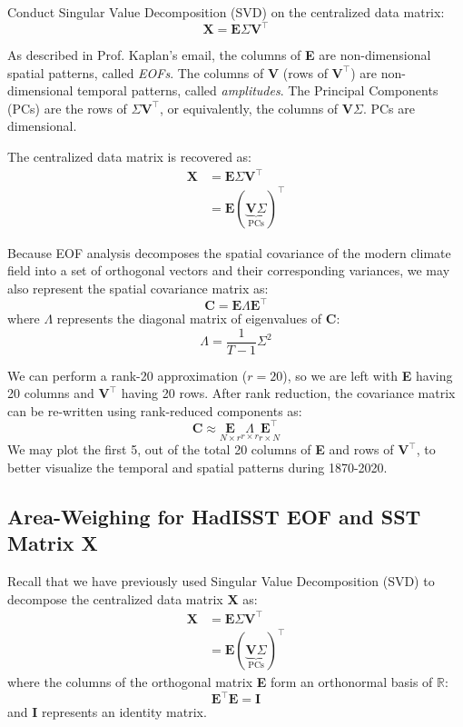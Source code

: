 \documentclass{article}
\begin{document}
Conduct Singular Value Decomposition (SVD) on the centralized data matrix:
$$\textbf{X} = \textbf{E} \Sigma \textbf{V}^\intercal$$

As described in Prof. Kaplan's email, the columns of \textbf{E} are non-dimensional spatial patterns, called \textit{EOFs}. The columns of \textbf{V} (rows of $\textbf{V}^\intercal$) are non-dimensional temporal patterns, called \textit{amplitudes}. The Principal Components (PCs) are the rows of $\Sigma \textbf{V}^\intercal$, or equivalently, the columns of $\textbf{V}\Sigma$. PCs are dimensional.

The centralized data matrix is recovered as:
\begin{align*}
    \textbf{X} &= \textbf{E} \Sigma \textbf{V}^\intercal \\
    &= \textbf{E}{(\underbrace{\textbf{V}\Sigma}_{\text{PCs}})}^\intercal
\end{align*}

Because EOF analysis decomposes the spatial covariance of the modern climate field into a set of orthogonal vectors and their corresponding variances, we may also represent the spatial covariance matrix as:
$$\textbf{C} = \textbf{E} \Lambda \textbf{E}^\intercal$$
where $\Lambda$ represents the diagonal matrix of eigenvalues of \textbf{C}:
$$\Lambda = \frac{1}{T-1}\Sigma^2$$

We can perform a rank-20 approximation ($r=20$), so we are left with \textbf{E} having 20 columns and $\textbf{V}^\intercal$ having 20 rows. After rank reduction, the covariance matrix can be re-written using rank-reduced components as:
$$\textbf{C} \approx \underset{N \times r}{\textbf{E}} \underset{r \times r}{\Lambda} \underset{r \times N}{\textbf{E}^\intercal}$$
We may plot the first 5, out of the total 20 columns of \textbf{E} and rows of $\textbf{V}^\intercal$, to better visualize the temporal and spatial patterns during 1870-2020.


\subsection{Area-Weighing for HadISST EOF and SST Matrix \textbf{X}}

Recall that we have previously used Singular Value Decomposition (SVD) to decompose the centralized data matrix \textbf{X} as:
\begin{align*}
    \textbf{X} &= \textbf{E} \Sigma \textbf{V}^\intercal \\
    &= \textbf{E}{(\underbrace{\textbf{V}\Sigma}_{\text{PCs}})}^\intercal
\end{align*}
where the columns of the orthogonal matrix \textbf{E} form an orthonormal basis of $\mathbb{R}$:
$$\textbf{E}^\intercal \textbf{E} = \textbf{I}$$
and \textbf{I} represents an identity matrix.
\end{document}
